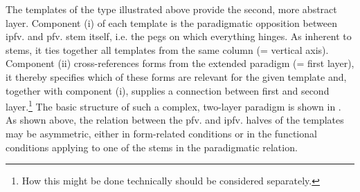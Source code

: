 \documentclass[output=paper]{langscibook}
\begin{document}
The templates of the type illustrated above provide the second, more abstract layer. Component (i) of each template is the paradigmatic opposition between ipfv. and pfv. stem itself, i.e. the pegs on which everything hinges. As inherent to stems, it ties together all templates from the same column (= vertical axis). Component (ii) cross-references forms from the extended paradigm (= first layer), it thereby specifies which of these forms are relevant for the given template and, together with component (i), supplies a connection between first and second layer.\footnote{How this might be done technically should be considered separately.} The basic structure of such a complex, two-layer paradigm is shown in . As shown above, the relation between the pfv. and ipfv. halves of the templates may be asymmetric, either in form-related conditions or in the functional conditions applying to one of the stems in the paradigmatic relation.\largerpage[1]
\end{document}
